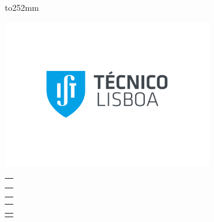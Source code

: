 %

\pagestyle{empty}

\enlargethispage{252mm minus \textheight}
\vbox to252mm {
%
%
\vspace*{-16.5mm}
\hspace*{-14.5mm}\includegraphics[width=90mm]{images/Logo_IST.pdf} %

\vspace*{15mm}

%
%
\hspace*{-10.5mm}
\begin{tabular}{p{155.5mm}}
\centering{\sffamily\bfseries\huge UNIVERSIDADE DE LISBOA}\\
\centering{\sffamily\bfseries\huge INSTITUTO SUPERIOR T\'{E}CNICO}\\
\smallskip
\end{tabular}

\vspace*{15mm} %

%
%
\hspace*{-10.5mm}
\begin{tabular}{p{155.5mm}}
\centering{\sffamily\bfseries\LARGE Big Data Privacy by Design Computation Platform}\\
\smallskip
\end{tabular}

\vspace*{15mm}

%
%
\hspace*{-10.5mm}
\begin{tabular}{p{155.5mm}}
\centering{\sffamily\bfseries\Large Rui Nuno Lopes Claro}\\
\end{tabular}

}
